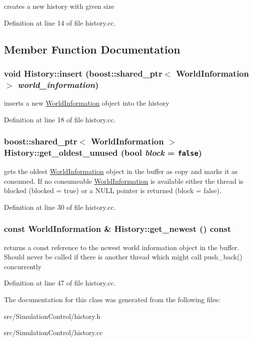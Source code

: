 creates a new history with given size 

Definition at line 14 of file history.cc.

\subsection{Member Function Documentation}
\hypertarget{class_history_552af5c8e63ab3f8470d5143a8f91cdf}{
\subsubsection[insert]{\setlength{\rightskip}{0pt plus 5cm}void History::insert (boost::shared\_\-ptr$<$ {\bf WorldInformation} $>$ {\em world\_\-information})}}
\label{class_history_552af5c8e63ab3f8470d5143a8f91cdf}


inserts a new \hyperlink{class_world_information}{WorldInformation} object into the history 

Definition at line 18 of file history.cc.\hypertarget{class_history_db58449276c5cd1da3837c233e908382}{
\subsubsection[get\_\-oldest\_\-unused]{\setlength{\rightskip}{0pt plus 5cm}boost::shared\_\-ptr$<$ {\bf WorldInformation} $>$ History::get\_\-oldest\_\-unused (bool {\em block} = {\tt false})}}
\label{class_history_db58449276c5cd1da3837c233e908382}


gets the oldest \hyperlink{class_world_information}{WorldInformation} object in the buffer as copy and marks it as consumed. If no consumeable \hyperlink{class_world_information}{WorldInformation} is available either the thread is blocked (blocked = true) or a NULL pointer is returned (block = false). 

Definition at line 30 of file history.cc.\hypertarget{class_history_bca19bfe4b9a2a4dea9c2ac42a22b4ab}{
\subsubsection[get\_\-newest]{\setlength{\rightskip}{0pt plus 5cm}const {\bf WorldInformation} \& History::get\_\-newest () const}}
\label{class_history_bca19bfe4b9a2a4dea9c2ac42a22b4ab}


returns a const reference to the newest world information object in the buffer. Should never be called if there is another thread which might call push\_\-back() concurrently 

Definition at line 47 of file history.cc.

The documentation for this class was generated from the following files:\begin{CompactItemize}
\item 
src/SimulationControl/history.h\item 
src/SimulationControl/history.cc\end{CompactItemize}
